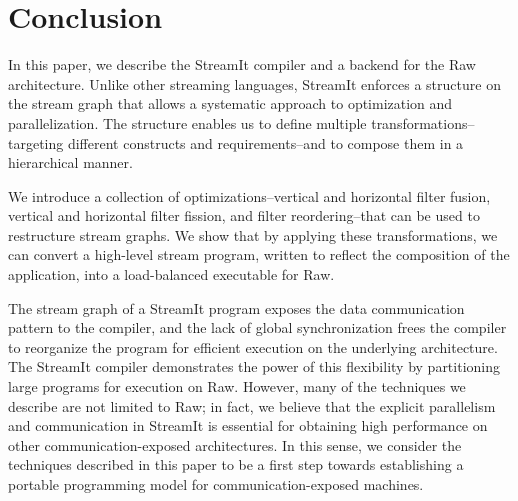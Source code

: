 \section{Conclusion}
\label{sec:conclusion}

In this paper, we describe the StreamIt compiler and a backend for the
Raw architecture.  Unlike other streaming languages, StreamIt enforces
a structure on the stream graph that allows a systematic approach to
optimization and parallelization.  The structure enables us to define
multiple transformations--targeting different constructs and
requirements--and to compose them in a hierarchical manner.

We introduce a collection of optimizations--vertical and horizontal
filter fusion, vertical and horizontal filter fission, and filter
reordering--that can be used to restructure stream graphs.  We show
that by applying these transformations, we can convert a high-level
stream program, written to reflect the composition of the application,
into a load-balanced executable for Raw.

The stream graph of a StreamIt program exposes the data communication
pattern to the compiler, and the lack of global synchronization frees
the compiler to reorganize the program for efficient execution on the
underlying architecture. The StreamIt compiler demonstrates the power
of this flexibility by partitioning large programs for execution on
Raw.  However, many of the techniques we describe are not limited to
Raw; in fact, we believe that the explicit parallelism and
communication in StreamIt is essential for obtaining high performance
on other communication-exposed architectures.  In this sense, we
consider the techniques described in this paper to be a first step
towards establishing a portable programming model for
communication-exposed machines.
